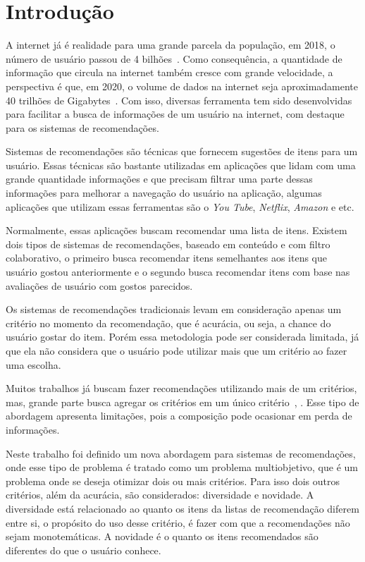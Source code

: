 \chapter{Introdução}
A internet já é realidade para uma grande parcela da população, em 2018, o número de usuário passou de 4 bilhões~\cite{internetusers}. Como consequência, a quantidade de informação que circula na internet também cresce com grande velocidade, a perspectiva é que, em 2020, o volume de dados na internet seja aproximadamente 40 trilhões de Gigabytes~\cite{volumedados}. Com isso, diversas ferramenta tem sido desenvolvidas para facilitar a busca de informações de um usuário na internet, com destaque para os sistemas de recomendações.

Sistemas de recomendações são técnicas que fornecem sugestões de itens para um usuário\cite{ricci2011introduction}. Essas técnicas são bastante utilizadas em aplicações que lidam com uma grande quantidade informações e que precisam filtrar uma parte dessas informações para melhorar a navegação do usuário na aplicação, algumas aplicações que utilizam essas ferramentas são o \textit{You Tube}, \textit{Netflix}, \textit{Amazon} e etc.

Normalmente, essas aplicações buscam recomendar uma lista de itens. Existem dois tipos de sistemas de recomendações, baseado em conteúdo e com filtro colaborativo, o primeiro busca recomendar itens semelhantes aos itens que usuário gostou anteriormente e o segundo busca recomendar itens com base nas avaliações de usuário com gostos parecidos.

Os sistemas de recomendações tradicionais levam em consideração apenas um critério no momento da recomendação, que é acurácia, ou seja, a chance do usuário gostar do item. Porém essa metodologia pode ser considerada limitada, já que ela não considera que o usuário pode utilizar mais que um critério ao fazer uma escolha\cite{adomavicius2011multi}. 

Muitos trabalhos já buscam fazer recomendações utilizando mais de um critérios, mas, grande parte busca agregar os critérios em um único critério~\cite{yager1988ordered}, \cite{kaymak1994selecting}. Esse tipo de abordagem apresenta limitações, pois a composição pode ocasionar em perda de informações.

Neste trabalho  foi definido um nova abordagem para sistemas de recomendações, onde esse tipo de problema é tratado como um problema multiobjetivo, que é um problema onde se deseja otimizar dois ou mais critérios. Para isso dois outros critérios, além da acurácia, são considerados: diversidade e novidade. A diversidade está relacionado ao quanto os itens da listas de recomendação diferem entre si, o propósito do uso desse critério, é fazer com que a recomendações não sejam monotemáticas\cite{hurley2011novelty}. A novidade é o quanto os itens recomendados são diferentes do que o usuário conhece\cite{hurley2011novelty}. 


